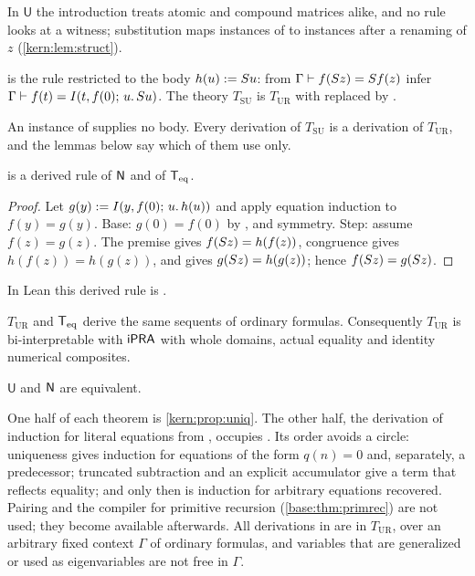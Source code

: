 In $\mathsf{U}$ the introduction  treats atomic and compound
matrices alike, and no rule looks at a witness; substitution maps instances
of  to instances after a renaming of $z$
(\cref{kern:lem:struct}).

\begin{definition}
\label{kern:def:SU}
 is the rule  restricted to the body
$h(u)\mathrel{:=}S u$: from $\Gamma\vdash f(S z)=S f(z)$ infer
$\Gamma\vdash f(t)=I(t,f(0);\,u.\,S u)$.  The theory
$T_{\mathrm{SU}}$ is $T_{\mathrm{UR}}$ with  replaced by
.
\end{definition}

An instance of  supplies no body.  Every derivation of
$T_{\mathrm{SU}}$ is a derivation of $T_{\mathrm{UR}}$, and the lemmas below
say which of them use  only.

\begin{proposition}
\label{kern:prop:uniq}
 is a derived rule of $\mathsf{N}$ and of $\mathsf{T}_{\mathrm{eq}}$.
\end{proposition}

\begin{proof}
Let $g(y)\mathrel{:=}I(y,f(0);\,u.\,h(u))$ and apply equation induction to
$f(y)=g(y)$.  Base: $g(0)=f(0)$ by , and symmetry.  Step:
assume $f(z)=g(z)$.  The premise gives $f(S z)=h(f(z))$, congruence gives
$h(f(z))=h(g(z))$, and  gives $g(S z)=h(g(z))$; hence
$f(S z)=g(S z)$.
\end{proof}

In Lean this derived rule is .

\begin{theorem}
\label{kern:thm:ur}
$T_{\mathrm{UR}}$ and $\mathsf{T}_{\mathrm{eq}}$ derive the same sequents of ordinary formulas.
Consequently $T_{\mathrm{UR}}$ is bi-interpretable with $\mathsf{iPRA}$ with whole
domains, actual equality and identity numerical composites.
\end{theorem}

\begin{theorem}
\label{kern:thm:urnative}
$\mathsf{U}$ and $\mathsf{N}$ are equivalent.
\end{theorem}

One half of each theorem is \cref{kern:prop:uniq}.  The other half, the
derivation of induction for literal equations from , occupies
.  Its order avoids a
circle: uniqueness gives induction for equations of the form $q(n)=0$ and,
separately, a predecessor; truncated subtraction and an explicit accumulator
give a term that reflects equality; and only then is induction for arbitrary
equations recovered.  Pairing and the compiler for primitive recursion
(\cref{base:thm:primrec}) are not used; they become available afterwards.
All derivations in
 are in $T_{\mathrm{UR}}$,
over an arbitrary fixed context $\Gamma$ of ordinary formulas, and variables
that are generalized or used as eigenvariables are not free in $\Gamma$.

